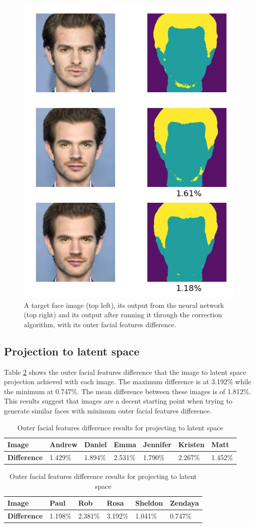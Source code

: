 \documentclass[review]{elsarticle}
\begin{document}
\begin{figure}[H]
  \includegraphics[width=0.5\linewidth, center]{Images/750.jpeg}
  \caption{A target face image (top left), its output from the neural network (top right) and its output after running it through the correction algorithm, with its outer facial features difference.}
  \label{fig:correction_demo}
\end{figure}

\subsection{Projection to latent space}

Table \ref{table:projection} shows the outer facial features difference that the image to latent space projection achieved with each image. The maximum difference is at 3.192\% while the minimum at 0.747\%. The mean difference between these images is of 1.812\%. This results suggest that images are a decent starting point when trying to generate similar faces with minimum outer facial features difference. 

\begin{table}[H]
\begin{tabular}{|l|l|l|l|l|l|l|}
\hline
\textbf{Image} & Andrew & Daniel & Emma & Jennifer & Kristen & Matt \\ \hline
\textbf{Difference} & 1.429\% & 1.894\% & 2.531\% & 1.790\% & 2.267\% & 1.452\% \\ \hline
\end{tabular}

\begin{tabular}{|l|l|l|l|l|l|}
\hline
\textbf{Image} & Paul & Rob & Rosa & Sheldon & Zendaya \\ \hline
\textbf{Difference} & 1.198\% & 2.381\% & 3.192\% & 1.041\% & 0.747\% \\ \hline
\end{tabular}

  \caption{Outer facial features difference results for projecting to latent space}
  \label{table:projection}
\end{table}
\end{document}
